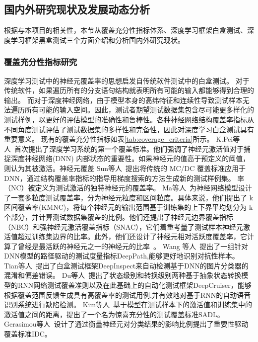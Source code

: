 \subsection{国内外研究现状及发展动态分析}\label{relatedwork}


根据与本项目的相关性，本节从覆盖充分性指标体系、深度学习框架白盒测试、深度学习框架黑盒测试三个方面介绍和分析国内外研究现状。




\subsubsection{覆盖充分性指标研究}
深度学习测试中的神经元覆盖率的思想启发自传统软件测试中的白盒测试。
对于传统软件，如果遍历所有的分支语句结构就表明所有可能的输入都能够得到合理的输出。
而对于深度神经网络，由于模型本身的高纬特征和连续性导致测试样本无法遍历所有可能的输入空间。因此，测试者期望测试数据集包含尽可能更多样化的测试样例，以更好的评估模型的准确性和鲁棒性。各种神经网络结构覆盖率指标从不同角度测试评估了测试数据集的多样性和完备性，因此对深度学习白盒测试具有重要意义。 
现有的覆盖充分性指标如表\cref{tab:coverage_criteria}所示。
K.Pei等人~首次提出了深度学习系统的第一个覆盖标准。他们强调了神经元激活值对于捕捉深度神经网络(DNN) 内部状态的重要性。如果神经元的值高于预定义的阈值，则认为其被激活。神经元覆盖
Sun等人~提出将传统的 MC/DC 覆盖标准应用于DNN，通过结构覆盖率指标的指导用梯度搜索的方法生成新的测试样例集。
率（NC）被定义为测试激活的独特神经元的覆盖率。
Ma等人~为神经网络模型设计了一套多粒度测试覆盖率，分为神经元粒度和区间粒度。具体来说，他们提出了 k区间覆盖率(KMNC)，将每个神经元的输出范围基于训练集的上下界平均划分为 k个部分，并计算测试数据集覆盖的比例。他们还提出了神经元边界覆盖指标（NBC）和强神经元激活覆盖指标（SNAC），它们着重考量了测试样本神经元激活值超过训练集边界的比率。此外，他们还设计了神经元相对活跃度覆盖率，它计算了曾经是最活跃的神经元之一的神经元的比率~。
Wang 等人~提出了一组针对DNN模型的路径驱动的测试度量指标DeepPath,能够更好地识别对抗性样本。
Tian等人~提出了白盒测试框架DeepInspect来自动检测基于DNN的图片分类器的混淆和偏差错误。
Du等人~提出了状态级别和转换级别两种基于抽象状态转换模型的RNN网络测试覆盖准则以及在此基础上的自动化测试框架DeepCruiser，能够根据覆盖范围反馈生成具有高覆盖率的测试用例,并有效地对基于RNN的自动语音识别系统进行缺陷检测。
Kim等人~基于模型在测试样本下的激活值和训练集中的激活值之间的距离，提出了一个名为惊喜充分性的测试覆盖标准SADL。
Gerasimou等人~设计了通过衡量神经元对分类结果的影响比例提出了重要性驱动覆盖标准IDC。

